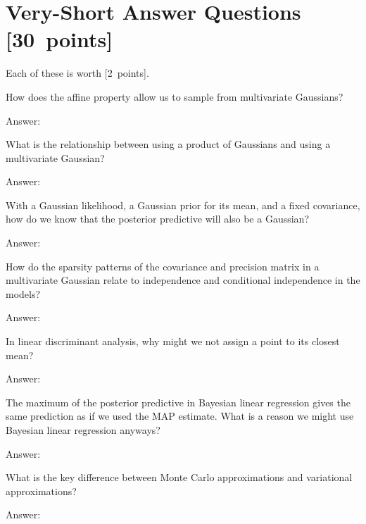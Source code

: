 \documentclass{article}
\newenvironment{answer}{\par\begingroup\color{answer}Answer: }{\endgroup}
\newcommand{\pts}[1]{\textcolor{points}{[#1~points]}}
\newcommand{\TODO}{\color{red}{TODO}}
\begin{document}
\clearpage
\section{Very-Short Answer Questions \pts{30}}

Each of these is worth \pts{2}.

\begin{qlist}
\item How does the affine property allow us to sample from multivariate Gaussians?
\begin{answer}\TODO\end{answer}

\item What is the relationship between using a product of Gaussians and using a multivariate Gaussian?
\begin{answer}\TODO\end{answer}

\item With a Gaussian likelihood, a Gaussian prior for its mean, and a fixed covariance, how do we know that the posterior predictive will also be a Gaussian?
\begin{answer}\TODO\end{answer}

\item How do the sparsity patterns of the covariance and precision matrix in a multivariate Gaussian relate to independence and conditional independence in the models?
\begin{answer}\TODO\end{answer}

\item In linear discriminant analysis, why might we not assign a point to its closest mean?
\begin{answer}\TODO\end{answer}

\item The maximum of the posterior predictive in Bayesian linear regression gives the same prediction as if we used the MAP estimate. What is a reason we might use Bayesian linear regression anyways?
\begin{answer}\TODO\end{answer}

\item What is the key difference between Monte Carlo approximations and variational approximations?
\begin{answer}\TODO\end{answer}


\end{qlist}
\end{document}
